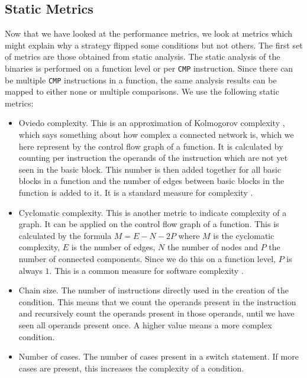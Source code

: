 \subsection{Static Metrics}\label{subsec:designStaticMetrics}
Now that we have looked at the performance metrics, we look at metrics which might explain why a strategy flipped some conditions but not others. The first set of metrics are those obtained from static analysis.
The static analysis of the binaries is performed on a function level or per \texttt{CMP} instruction. Since there can be multiple \texttt{CMP} instructions in a function, the same analysis results can be mapped to either none or multiple comparisons. We use the following static metrics:
\begin{itemize}
    \item Oviedo complexity. This is an approximation of Kolmogorov complexity \cite{kolmogorov1998tables}, which says something about how complex a connected network is, which we here represent by the control flow graph of a function. It is calculated by counting per instruction the operands of the instruction which are not yet seen in the basic block. This number is then added together for all basic blocks in a function and the number of edges between basic blocks in the function is added to it. It is a standard measure for complexity \cite{zuse2019software}.
    \item Cyclomatic complexity. This is another metric to indicate complexity of a graph. It can be applied on the control flow graph of a function. This is calculated by the formula $M = E-N-2P$ where $M$ is the cyclomatic complexity, $E$ is the number of edges, $N$ the number of nodes and $P$ the number of connected components. Since we do this on a function level, $P$ is always $1$. This is a common measure for software complexity \cite{jorgensen2018software}.
    \item Chain size. The number of instructions directly used in the creation of the condition. This means that we count the operands present in the instruction and recursively count the operands present in those operands, until we have seen all operands present once. A higher value means a more complex condition.
    \item Number of cases. The number of cases present in a switch statement. If more  cases are present, this increases the complexity of a condition.
\end{itemize}

